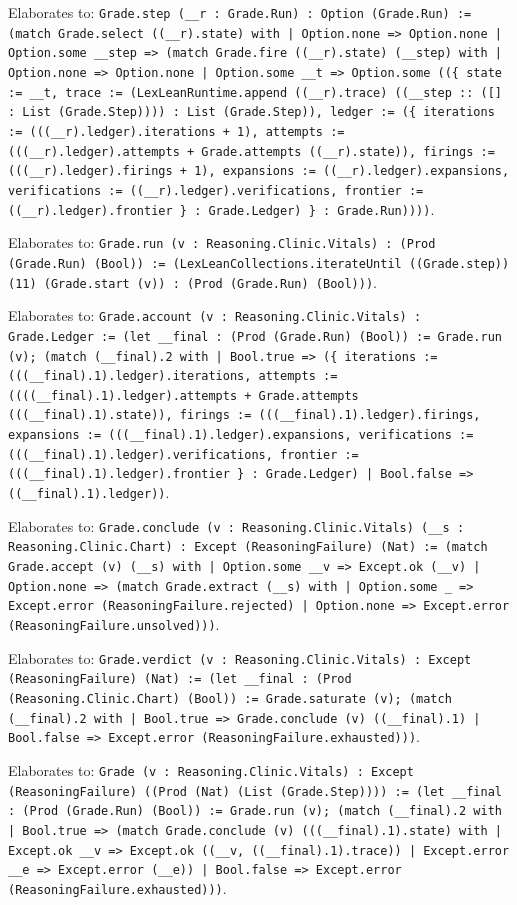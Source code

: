 \documentclass[11pt]{article}
\begin{document}
\noindent Elaborates to: \texttt{Grade.step (\_\_r : Grade.Run) : Option (Grade.Run) := (match Grade.select ((\_\_r).state) with | Option.none => Option.none | Option.some \_\_step => (match Grade.fire ((\_\_r).state) (\_\_step) with | Option.none => Option.none | Option.some \_\_t => Option.some ((\{ state := \_\_t, trace := (LexLeanRuntime.append ((\_\_r).trace) ((\_\_step :: ([] : List (Grade.Step)))) : List (Grade.Step)), ledger := (\{ iterations := (((\_\_r).ledger).iterations + 1), attempts := (((\_\_r).ledger).attempts + Grade.attempts ((\_\_r).state)), firings := (((\_\_r).ledger).firings + 1), expansions := ((\_\_r).ledger).expansions, verifications := ((\_\_r).ledger).verifications, frontier := ((\_\_r).ledger).frontier \} : Grade.Ledger) \} : Grade.Run))))}.\par
\noindent Elaborates to: \texttt{Grade.run (v : Reasoning.Clinic.Vitals) : (Prod (Grade.Run) (Bool)) := (LexLeanCollections.iterateUntil ((Grade.step)) (11) (Grade.start (v)) : (Prod (Grade.Run) (Bool)))}.\par
\noindent Elaborates to: \texttt{Grade.account (v : Reasoning.Clinic.Vitals) : Grade.Ledger := (let \_\_final : (Prod (Grade.Run) (Bool)) := Grade.run (v); (match (\_\_final).2 with | Bool.true => (\{ iterations := (((\_\_final).1).ledger).iterations, attempts := ((((\_\_final).1).ledger).attempts + Grade.attempts (((\_\_final).1).state)), firings := (((\_\_final).1).ledger).firings, expansions := (((\_\_final).1).ledger).expansions, verifications := (((\_\_final).1).ledger).verifications, frontier := (((\_\_final).1).ledger).frontier \} : Grade.Ledger) | Bool.false => ((\_\_final).1).ledger))}.\par
\noindent Elaborates to: \texttt{Grade.conclude (v : Reasoning.Clinic.Vitals) (\_\_s : Reasoning.Clinic.Chart) : Except (ReasoningFailure) (Nat) := (match Grade.accept (v) (\_\_s) with | Option.some \_\_v => Except.ok (\_\_v) | Option.none => (match Grade.extract (\_\_s) with | Option.some \_ => Except.error (ReasoningFailure.rejected) | Option.none => Except.error (ReasoningFailure.unsolved)))}.\par
\noindent Elaborates to: \texttt{Grade.verdict (v : Reasoning.Clinic.Vitals) : Except (ReasoningFailure) (Nat) := (let \_\_final : (Prod (Reasoning.Clinic.Chart) (Bool)) := Grade.saturate (v); (match (\_\_final).2 with | Bool.true => Grade.conclude (v) ((\_\_final).1) | Bool.false => Except.error (ReasoningFailure.exhausted)))}.\par
\noindent Elaborates to: \texttt{Grade (v : Reasoning.Clinic.Vitals) : Except (ReasoningFailure) ((Prod (Nat) (List (Grade.Step)))) := (let \_\_final : (Prod (Grade.Run) (Bool)) := Grade.run (v); (match (\_\_final).2 with | Bool.true => (match Grade.conclude (v) (((\_\_final).1).state) with | Except.ok \_\_v => Except.ok ((\_\_v, ((\_\_final).1).trace)) | Except.error \_\_e => Except.error (\_\_e)) | Bool.false => Except.error (ReasoningFailure.exhausted)))}.\par
\end{document}
